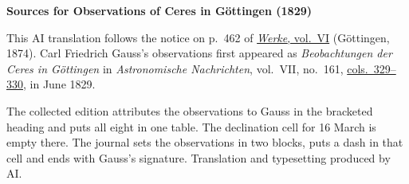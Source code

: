 \clearpage\thispagestyle{empty}
\begin{center}\textbf{Sources for Observations of Ceres in Göttingen (1829)}\end{center}
\noindent This AI translation follows the notice on p.~462 of \href{https://gdz.sub.uni-goettingen.de/id/PPN236007467}{\textit{Werke}, vol.~VI} (Göttingen, 1874). Carl Friedrich Gauss’s observations first appeared as \textit{Beobachtungen der Ceres in Göttingen} in \textit{Astronomische Nachrichten}, vol.~VII, no.~161, \href{https://api.digitale-sammlungen.de/iiif/image/v2/bsb10049432_00211/full/1800,/0/default.jpg}{cols.~329--330}, in June 1829.
\par\smallskip\noindent The collected edition attributes the observations to Gauss in the bracketed heading and puts all eight in one table. The declination cell for 16 March is empty there. The journal sets the observations in two blocks, puts a dash in that cell and ends with Gauss’s signature. Translation and typesetting produced by AI.
\clearpage
